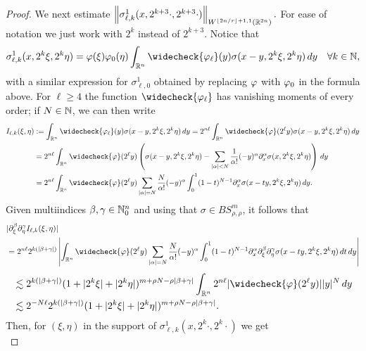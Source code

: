 \begin{proof}
We next estimate $\left\|\sigma^1_{\ell, k}(x, 2^{k+3} \cdot, 2^{k+3} \cdot)\right\|_{W^{\lfloor{2n/r}\rfloor + 1,1}(\mathbb{R}^{2n})}.$ For ease of notation we just work with $2^k$ instead of $2^{k+3}.$ Notice that 
\begin{equation*}
\sigma^1_{\ell, k}(x, 2^k \xi, 2^k \eta) = \f(\xi) \f_0(\eta) \int_{\rn} \widecheck{\f_\ell}(y) \sigma(x-y, 2^k \xi, 2^k \eta)\dy\quad \forall k\in\na,
\end{equation*}
with a similar expression for $\sigma^1_{\ell, 0}$ obtained by replacing $\varphi$ with $\varphi_0$ in the formula above. 
 For $\ell \geq 4$ the function $\widecheck{\f_\ell}$ has vanishing moments of every order; if $N \in \mathbb{N}$, we can then write
\begin{align*}
 I_{\ell, k}(\xi, \eta)&:= \int_{\rn} \widecheck{\f_\ell}(y) \sigma(x-y, 2^k \xi, 2^k \eta)\dy=2^{n \ell}\int_{\rn} \widecheck{\f}(2^{\ell}y) \sigma(x-y, 2^k \xi, 2^k \eta)\dy\\
& = 2^{n \ell} \int_{\rn} \widecheck{\f}(2^{\ell}y) \left( \sigma(x-y, 2^k \xi, 2^k \eta) - \sum\limits_{|\alpha| < N} \frac{1}{\alpha!} (-y)^\alpha \partial_x^\alpha \sigma(x, 2^k \xi, 2^k \eta) \right)\dy\\
& = 2^{n \ell} \int_{\rn} \widecheck{\f}(2^{\ell}y) \sum\limits_{|\alpha| = N} \frac{N}{\alpha!} (-y)^\alpha \int_0^1 (1-t)^{N-1} \partial_x^\alpha \sigma(x - t y, 2^k \xi, 2^k \eta) \dy.
\end{align*}
Given multiindices $\beta, \gamma \in \mathbb{N}_0^n$ and using that $\sigma \in BS^m_{\rho, \rho}$, it follows that
\begin{align*}
& |\partial_\xi^{\beta} \partial_\eta^{\gamma}  I_{\ell, k}(\xi, \eta)|\\
& = 2^{n \ell} 2^{k (|\beta+ \gamma|)}  \left|  \int_{\rn} \widecheck{\f}(2^{\ell}y) \sum\limits_{|\alpha| = N} \frac{N}{\alpha!} (-y)^\alpha \int_0^1 (1-t)^{N-1} \partial_x^\alpha \partial_\xi^{\beta} \partial_\eta^{\gamma}\sigma(x - t y, 2^k \xi, 2^k \eta) \,dt\dy \right| 
\end{align*}
\begin{align*}
& \lesssim  2^{k (|\beta+ \gamma|)}  (1+ |2^k \xi| + |2^k \eta|)^{m + \rho N -  \rho|\beta+ \gamma|} \int_{\rn} 2^{n \ell} |\widecheck{\f}(2^{\ell}y)| |y|^N \dy \\
&\lesssim 2^{- N \ell} 2^{k (|\beta+ \gamma|)}  (1+ |2^k \xi| + |2^k \eta|)^{m + \rho N -  \rho |\beta+ \gamma|}.
\end{align*}
Then, for $(\xi,\eta)$ in the support of $\sigma^1_{\ell,k}(x, 2^k\cdot,2^k\cdot)$  we get
\begin{equation*}

\end{equation*}
\end{proof}
